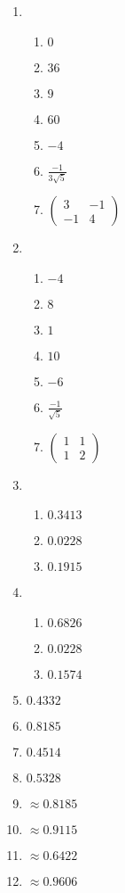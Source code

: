 \begin{multicols}{2}
\begin{enumerate}
\item
\begin{enumerate}
\item $0 $
\item $36$
\item $9 $
\item $60 $
\item $-4$
\item $\frac{-1}{3\sqrt{5}}$
\item $\begin{pmatrix}
 3 & -1 \\
-1 & 4
\end{pmatrix}$
\end{enumerate}

\item
\begin{enumerate}
\item $-4$
\item $8 $
\item $1 $
\item $10$
\item $-6$
\item$ \frac{-1}{\sqrt{5}}$

\item $\begin{pmatrix}
 1 & 1 \\
 1 & 2
\end{pmatrix}$
\end{enumerate}
\item
\begin{enumerate}
\item $0.3413$
\item $0.0228$
\item $0.1915$
\end{enumerate}

\item
\begin{enumerate}
\item $0.6826$
\item $0.0228$
\item $0.1574$
\end{enumerate}

\item $0.4332$
\item $0.8185$
\item $0.4514$
\item $0.5328$
\item $\approx 0.8185$
\item $\approx 0.9115$
\item $\approx 0.6422$
\item $\approx 0.9606$


\end{enumerate}
\end{multicols}
